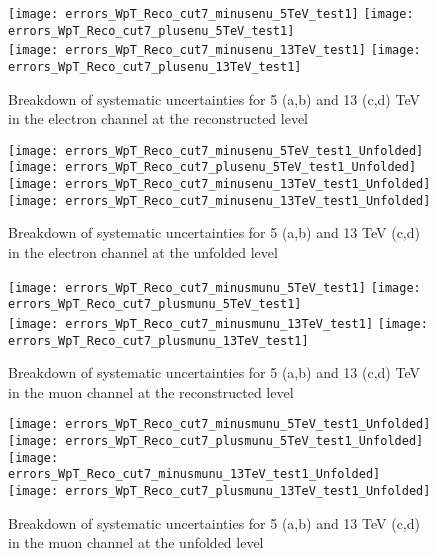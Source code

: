 \begin{figure}[h]
	\centering
	{\texttt{[image: errors\_WpT\_Reco\_cut7\_minusenu\_5TeV\_test1]}}
	{\texttt{[image: errors\_WpT\_Reco\_cut7\_plusenu\_5TeV\_test1]}} \\
	{\texttt{[image: errors\_WpT\_Reco\_cut7\_minusenu\_13TeV\_test1]}}
	{\texttt{[image: errors\_WpT\_Reco\_cut7\_plusenu\_13TeV\_test1]}}
	
	\caption{ Breakdown of systematic uncertainties for 5 (a,b) and 13 (c,d) TeV in the electron channel at the reconstructed level}
	\label{fig:reco_sys_bkd_elec}
\end{figure}

\begin{figure}[h]
	\centering
	{\texttt{[image: errors\_WpT\_Reco\_cut7\_minusenu\_5TeV\_test1\_Unfolded]}}
	{\texttt{[image: errors\_WpT\_Reco\_cut7\_plusenu\_5TeV\_test1\_Unfolded]}} \\
	{\texttt{[image: errors\_WpT\_Reco\_cut7\_minusenu\_13TeV\_test1\_Unfolded]}}
	{\texttt{[image: errors\_WpT\_Reco\_cut7\_minusenu\_13TeV\_test1\_Unfolded]}}
	\caption{ Breakdown of systematic uncertainties for 5 (a,b) and 13 TeV (c,d) in the electron channel at the unfolded level}
	\label{fig:unf_sys_bkd_elec}
\end{figure}

\begin{figure}[h]
	\centering
	{\texttt{[image: errors\_WpT\_Reco\_cut7\_minusmunu\_5TeV\_test1]}}
	{\texttt{[image: errors\_WpT\_Reco\_cut7\_plusmunu\_5TeV\_test1]}} \\
	{\texttt{[image: errors\_WpT\_Reco\_cut7\_minusmunu\_13TeV\_test1]}}
	{\texttt{[image: errors\_WpT\_Reco\_cut7\_plusmunu\_13TeV\_test1]}}
	\caption{ Breakdown of systematic uncertainties for 5 (a,b) and 13 (c,d) TeV in the muon channel at the reconstructed level}
	\label{fig:reco_sys_bkd_muons}
\end{figure}

\begin{figure}[h]
	\centering
	{\texttt{[image: errors\_WpT\_Reco\_cut7\_minusmunu\_5TeV\_test1\_Unfolded]}}
	{\texttt{[image: errors\_WpT\_Reco\_cut7\_plusmunu\_5TeV\_test1\_Unfolded]}} \\
	{\texttt{[image: errors\_WpT\_Reco\_cut7\_minusmunu\_13TeV\_test1\_Unfolded]}}
	{\texttt{[image: errors\_WpT\_Reco\_cut7\_plusmunu\_13TeV\_test1\_Unfolded]}}
	\caption{ Breakdown of systematic uncertainties for 5 (a,b) and 13 TeV (c,d) in the muon channel at the unfolded level}
	\label{fig:unf_sys_bkd_muons}
\end{figure}
\clearpage
